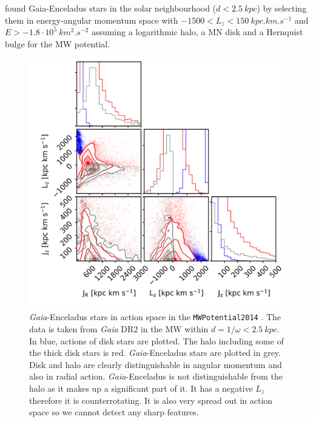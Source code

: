 \citet{Enceladus....Helmi...2018} found Gaia-Enceladus stars in the solar neighbourhood ($d < \SI{2.5}{kpc}$) by selecting them in energy-angular momentum space with $ −1500 < L_z < \SI{150}{kpc.km.s^{-1}}$ and $E >−1.8\cdot 10^5\SI{}{km^2.s^{-2}}$ assuming a logarithmic halo, a \ac{MN} disk and a Hernquist bulge for the \ac{MW} potential.

\begin{figure}[htbp]
\captionsetup{format=plain}
    \centering
    \includegraphics[width=1.0\textwidth]{plots/Discussion/Gaia_all_actions.png}
    \caption{\textit{Gaia}-Enceladus stars in action space in the \texttt{MWPotential2014} \citep{Bovy...galpy...2015}. The data is taken from \textit{Gaia} DR2 \citep{GaiaDR2...overview...2018} in the \ac{MW} within $d = 1/\omega <\SI{2.5}{kpc}$. In blue, actions of disk stars are plotted. The halo including some of the thick disk stars is red. \textit{Gaia}-Enceladus stars are plotted in grey. Disk and halo are clearly distinguishable in angular momentum and also in radial action. \textit{Gaia}-Enceladus is not distinguishable from the halo as it makes up a significant part of it. It has a negative $L_z$ therefore it is counterrotating. It is also very spread out in action space so we cannot detect any sharp features.}
    \label{fig:Gaia_Enceladus_actions}
\end{figure}
